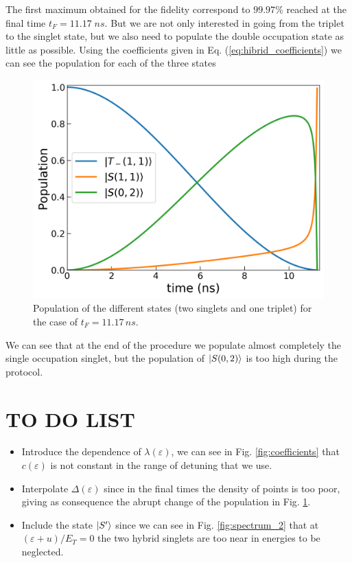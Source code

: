 \documentclass[aip,rsi,amsmath,amssymb,reprint, english]{revtex4-1}
\begin{document}
The first maximum obtained for the fidelity correspond to $99.97\% $ reached at the final time $t_F=11.17 \; ns$. But we are not only interested in going from the triplet to the singlet state, but we also need to populate the double occupation state as little as possible. Using the coefficients given in Eq. (\ref{eq:hibrid_coefficients}) we can see the population for each of the three states

\begin{figure}[h!]
	\centering
	\includegraphics[width=\linewidth]{population_1}
	\caption{Population of the different states (two singlets and one triplet) for the case of $t_F=11.17 \, ns$.}
	\label{fig:population_1}
\end{figure}

We can see that at the end of the procedure we populate almost completely the single occupation singlet, but the population of $\ket{S(0,2)}$ is too high during the protocol.

\section*{TO DO LIST}

\begin{itemize}
	
	\item Introduce the dependence of $\lambda(\varepsilon)$, we can see in Fig. \ref{fig:coefficients} that $c(\varepsilon)$ is not constant in the range of detuning that we use.
	
	\item Interpolate $\Delta(\varepsilon)$ since in the final times the density of points is too poor, giving as consequence the abrupt change of the population in Fig. \ref{fig:population_1}.
	
	\item Include the state $\ket{S^{\prime}}$ since we can see in Fig. \ref{fig:spectrum_2} that at $(\varepsilon+u)/E_T=0$ the two hybrid singlets are too near in energies to be neglected.
\end{itemize}

	
\end{document}

